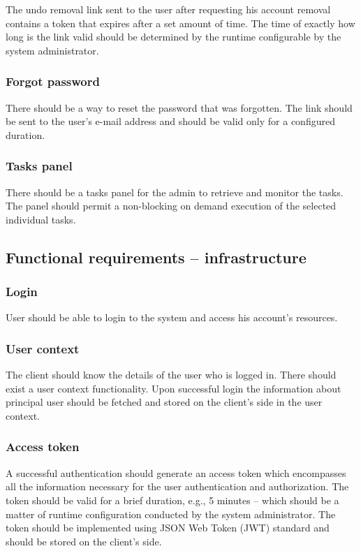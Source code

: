 \documentclass[a4paper,twoside,12pt]{book}
\begin{document}
The undo removal link sent to the user after requesting his account removal contains a token that expires after a set amount of time. The time of exactly how long is the link valid should be determined by the runtime configurable by the system administrator.

\subsubsection{Forgot password}

There should be a way to reset the password that was forgotten. The link should be sent to the user's e-mail address and should be valid only for a configured duration.

\subsubsection{Tasks panel}

There should be a tasks panel for the admin to retrieve and monitor the tasks. The panel should permit a non-blocking on demand execution of the selected individual tasks.


\subsection{Functional requirements – infrastructure}

\subsubsection{Login}

User should be able to login to the system and access his account's resources.

\subsubsection{User context}

The client should know the details of the user who is logged in. There should exist a user context functionality. Upon successful login the information about principal user should be fetched and stored on the client's side in the user context.

\subsubsection{Access token}

A successful authentication should generate an access token which encompasses all the information necessary for the user authentication and authorization. The token should be valid for a brief duration, e.g., 5 minutes – which should be a matter of runtime configuration conducted by the system administrator. The token should be implemented using JSON Web Token (JWT) standard and should be stored on the client's side.
\end{document}
